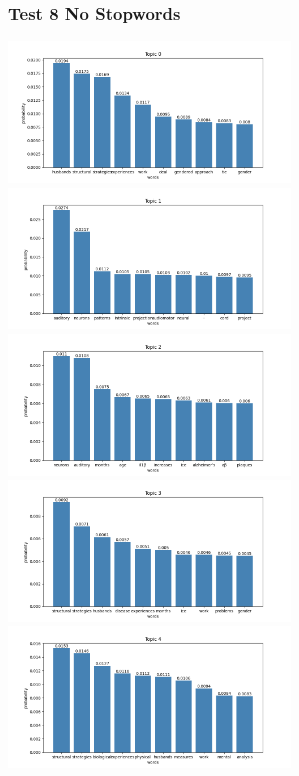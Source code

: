 \documentclass[10pt]{article} %
\begin{document}
	\subsubsection{Test 8 No Stopwords}
	
	\begin{center}
		\includegraphics[width=7.5cm]{images/plots/test_8_no_stopwords/topic_0.png}
		\includegraphics[width=7.5cm]{images/plots/test_8_no_stopwords/topic_1.png}
		\includegraphics[width=7.5cm]{images/plots/test_8_no_stopwords/topic_2.png}
		\includegraphics[width=7.5cm]{images/plots/test_8_no_stopwords/topic_3.png}\
		\includegraphics[width=7.5cm]{images/plots/test_8_no_stopwords/topic_4.png}

\end{center}
\end{document}
